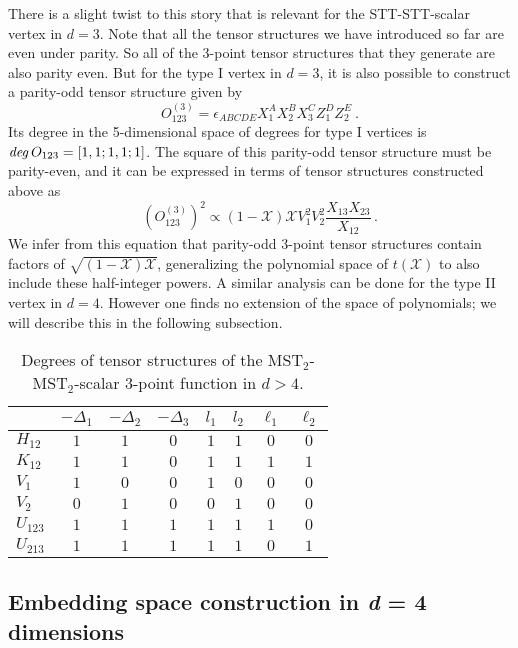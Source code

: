 \documentclass{article}
\begin{document}
There is a slight twist to this story that is relevant for the STT-STT-scalar vertex in $d=3$. 
Note that all the tensor structures we have introduced so far are even under parity. So all 
of the 3-point tensor structures that they generate are also parity even. But for the type I vertex in $d=3$, it is also possible to construct a parity-odd tensor structure given 
by 
\begin{equation} 
O^{(3)}_{123} = \epsilon_{ABCDE}X_1^A X_2^B X_3^C Z_1^D Z_2^E\ . 
\end{equation}
Its degree in the 5-dimensional space of degrees for type I vertices is $\textit{deg\/}\, O_{123}=
[1,1;1,1;1]$. The square of this parity-odd tensor structure must be parity-even, and it can be
expressed in terms of tensor structures constructed above as 
\begin{equation}
    \left(O^{(3)}_{123}\right)^2 \propto 
    (1-\mathcal{X})\mathcal{X} V_1^2 V_2^2\frac{ X_{13}X_{23}}{X_{12}}\,.
    \label{eq:parityoddsquared}
\end{equation}
We infer from this equation that parity-odd 3-point tensor structures contain factors of
$\sqrt{(1-\mathcal{X})\mathcal{X}}$, generalizing the polynomial space of $t(\mathcal{X})$ to 
also include these half-integer powers. A similar analysis can be done for the type II vertex
in $d=4$. However one finds no extension of the space of polynomials; we will describe this in the following subsection.

\begin{table}[t]
    \centering
\begin{tabular}{l|c c c c c c c}
    &  $-\Delta_1$ & $-\Delta_2$ & $-\Delta_3$ & $l_1$ & $l_2$ & $\ell_1$ & $\ell_2$ \\
    \midrule
$H_{12}$ & $1$ & $1$ & $0$ & $1$ & $1$ & $0$ & $0$  \\
$K_{12}$ & $1$ & $1$ & $0$ & $1$ & $1$ & $1$ & $1$  \\
$V_1$ & $1$ & $0$ & $0$ & $1$ & $0$& $0$ & $0$  \\
$V_2$ & $0$ & $1$ & $0$ & $0$ & $1$& $0$ & $0$ \\
$U_{123}$ & $1$ & $1$ & $1$ & $1$ & $1$& $1$ & $0$ \\
$U_{213}$ & $1$ & $1$ & $1$ & $1$ & $1$& $0$ & $1$
\end{tabular}
     \caption{Degrees of tensor structures of the MST$_2$-MST$_2$-scalar 3-point function in $d>4$.}
   \label{tab:TS_d>4}
\end{table}


\subsection{Embedding space construction in \textit{d} = 4 dimensions}
\label{sect:four_dimensions_3pt}
\end{document}
